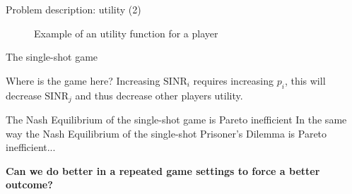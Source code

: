 \begin{frame}{Problem description: utility (2)}
    \begin{figure}
        \centering
        \caption{Example of an utility function for a player}
    \end{figure}
\end{frame}


\begin{frame}{The single-shot game}
    \begin{block}{Where is the game here?}
        Increasing $\text{SINR}_i$ requires increasing $p_i$, this will decrease $\text{SINR}_j$ and
        thus decrease other players utility.
    \end{block}
    \pause 
    \vspace{0.5cm}
    \begin{alertblock}{The Nash Equilibrium of the single-shot game is Pareto inefficient}
        In the same way the Nash Equilibrium of the single-shot Prisoner's Dilemma is
        Pareto inefficient...
    \end{alertblock}
    \pause
    \vspace{0.5cm}
    \textbf{{\color{green}Can we do better in a repeated game settings to force a better outcome?}}
\end{frame}

